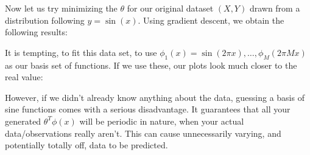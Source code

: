 \documentclass[11pt,letterpaper]{article}
\begin{document}
Now let us try minimizing the $\theta$ for our original dataset $(X, Y)$ drawn from a distribution following $y = \sin(x)$. Using gradient descent, we obtain the following results:

It is tempting, to fit this data set, to use $\phi_1(x) = \sin(2\pi x), \ldots , \phi_M(2\pi Mx)$ as our basis set of functions. If we use these, our plots look much closer to the real value:

However, if we didn't already know anything about the data, guessing a basis of sine functions comes with a serious disadvantage. It guarantees that all your generated $\theta^T\phi(x)$ will be periodic in nature, when your actual data/observations really aren't. This can cause unnecessarily varying, and potentially totally off, data to be predicted.

\section{}
\end{document}
